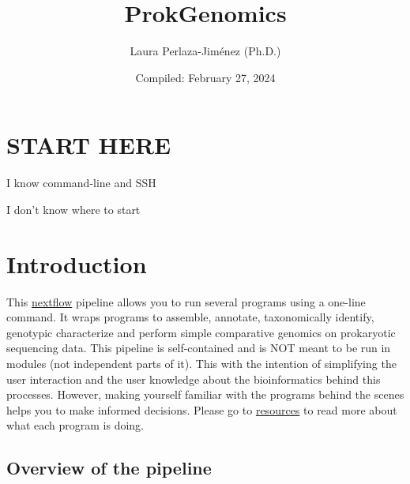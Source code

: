 \documentclass[
]{book}
\title{ProkGenomics}
\author{Laura Perlaza-Jiménez (Ph.D.)}
\date{Compiled: February 27, 2024}
\begin{document}
\maketitle

{
\setcounter{tocdepth}{1}
\tableofcontents
}
\hypertarget{start-here}{%
\chapter{START HERE}\label{start-here}}

{I know command-line and SSH}

{I don't know where to start}

\hypertarget{introduction}{%
\chapter{Introduction}\label{introduction}}

This \href{https://www.nextflow.io/}{nextflow} pipeline allows you to run several programs using a one-line command. It wraps programs to assemble, annotate, taxonomically identify, genotypic characterize and perform simple comparative genomics on prokaryotic sequencing data. This pipeline is self-contained and is NOT meant to be run in modules (not independent parts of it). This with the intention of simplifying the user interaction and the user knowledge about the bioinformatics behind this processes. However, making yourself familiar with the programs behind the scenes helps you to make informed decisions. Please go to \href{resources.html}{resources} to read more about what each program is doing.

\hypertarget{overview-of-the-pipeline}{%
\section{Overview of the pipeline}\label{overview-of-the-pipeline}}
\end{document}
